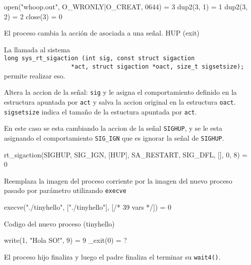\begin{framed}
\begin{verbatimtab}
open("whoop.out", O_WRONLY|O_CREAT, 0644) = 3
dup2(3, 1)                  = 1
dup2(3, 2)                  = 2
close(3)                    = 0
\end{verbatimtab}
\end{framed}

El proceso cambia la acci\'on de asociada a una se\~nal. HUP (exit)

La llamada al sistema\\
 \verb|long sys_rt_sigaction (int sig, const struct sigaction |\\
 \verb|                   *act, struct sigaction *oact, size_t sigsetsize);| \\
permite realizar eso.

Altera la accion de la se\~nal: \verb|sig| y le asigna el comportamiento definido en la estructura apuntada por \verb|act| y salva la accion original en la estructura \verb|oact|.
\verb|sigsetsize| indica el tama\~no de la estuctura apuntada por \verb|act|.

En este caso se esta cambiando la accion de la se\~nal \verb|SIGHUP|, y se le esta asignando el comportamiento \verb|SIG_IGN| que es ignorar la se\~nal de \verb|SIGHUP|.

\begin{framed}
\begin{verbatimtab}
rt_sigaction(SIGHUP, {SIG_IGN, [HUP], SA_RESTART}, {SIG_DFL, [], 0}, 8) = 0
\end{verbatimtab}
\end{framed}

Reemplaza la imagen del proceso corriente por la imagen del nuevo proceso pasado por par\'ametro utilizando \verb|execve|
\begin{framed}
\begin{verbatimtab}
execve("./tinyhello", ["./tinyhello"], [/* 39 vars */]) = 0
\end{verbatimtab}
\end{framed}

Codigo del nuevo proceso (tinyhello)
\begin{framed}
\begin{verbatimtab}
write(1, "Hola SO!\n", 9)   = 9
_exit(0)                    = ?
\end{verbatimtab}
\end{framed}

El proceso hijo finaliza y luego el padre finaliza el terminar su \verb|wait4()|. 	

